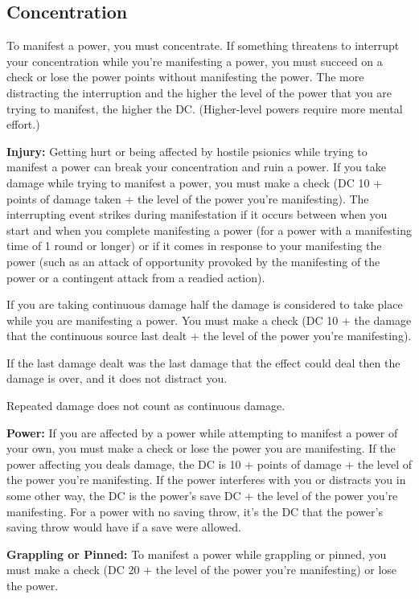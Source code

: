 \subsection{Concentration}
To manifest a power, you must concentrate. If something threatens to interrupt your concentration while you're manifesting a power, you must succeed on a  check or lose the power points without manifesting the power. The more distracting the interruption and the higher the level of the power that you are trying to manifest, the higher the DC. (Higher-level powers require more mental effort.)

\textbf{Injury:} Getting hurt or being affected by hostile psionics while trying to manifest a power can break your concentration and ruin a power. If you take damage while trying to manifest a power, you must make a  check (DC 10 + points of damage taken + the level of the power you're manifesting). The interrupting event strikes during manifestation if it occurs between when you start and when you complete manifesting a power (for a power with a manifesting time of 1 round or longer) or if it comes in response to your manifesting the power (such as an attack of opportunity provoked by the manifesting of the power or a contingent attack from a readied action).

If you are taking continuous damage half the damage is considered to take place while you are manifesting a power. You must make a  check (DC 10 + \onehalf the damage that the continuous source last dealt + the level of the power you're manifesting).

If the last damage dealt was the last damage that the effect could deal then the damage is over, and it does not distract you.

Repeated damage does not count as continuous damage.

\textbf{Power:} If you are affected by a power while attempting to manifest a power of your own, you must make a  check or lose the power you are manifesting. If the power affecting you deals damage, the  DC is 10 + points of damage + the level of the power you're manifesting. If the power interferes with you or distracts you in some other way, the  DC is the power's save DC + the level of the power you're manifesting. For a power with no saving throw, it's the DC that the power's saving throw would have if a save were allowed.

\textbf{Grappling or Pinned:} To manifest a power while grappling or pinned, you must make a  check (DC 20 + the level of the power you're manifesting) or lose the power.

